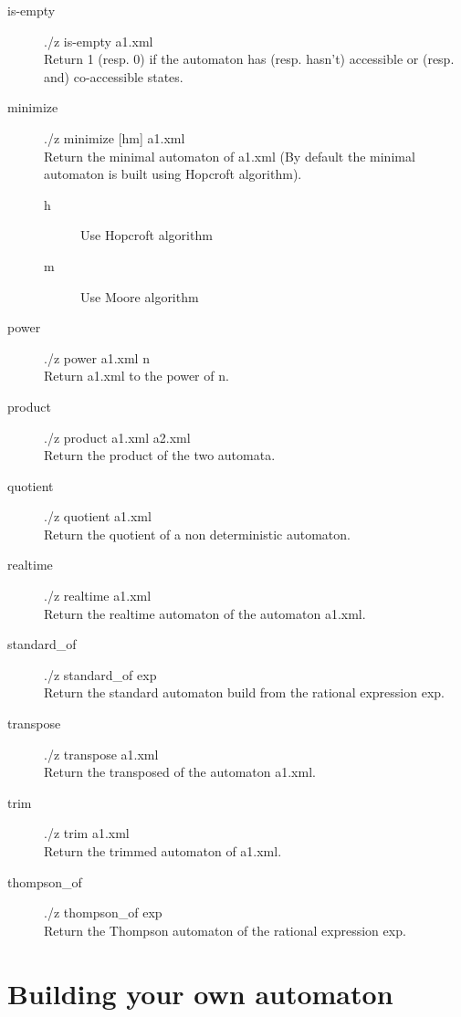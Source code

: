 \begin{description}
  \item [is-empty]
    ./z is-empty a1.xml\\
    Return 1 (resp. 0) if the automaton has (resp. hasn't) accessible
    or (resp. and) co-accessible states.

  \item [minimize]
    ./z minimize [hm] a1.xml\\
    Return the minimal automaton of a1.xml (By default the minimal
    automaton is built using Hopcroft algorithm).
    \begin{description}
      \item [h] Use Hopcroft algorithm
      \item [m] Use Moore algorithm
    \end{description}

  \item [power]
    ./z power a1.xml n\\
    Return a1.xml to the power of n.

  \item [product]
    ./z product a1.xml a2.xml\\
    Return the product of the two automata.

  \item [quotient]
    ./z quotient a1.xml\\
    Return the quotient of a non deterministic automaton.

  \item [realtime]
    ./z realtime a1.xml\\
    Return the realtime automaton of the automaton a1.xml.

  \item [standard\_of]
    ./z standard\_of exp\\
    Return the standard automaton build from the rational expression exp.

  \item [transpose]
    ./z transpose a1.xml\\
    Return the transposed of the automaton a1.xml.

  \item [trim]
    ./z trim a1.xml\\
    Return the trimmed automaton of a1.xml.

  \item [thompson\_of]
    ./z thompson\_of exp\\
    Return the Thompson automaton of the rational expression exp.
\end{description}
\newpage

\section{Building your own automaton}
